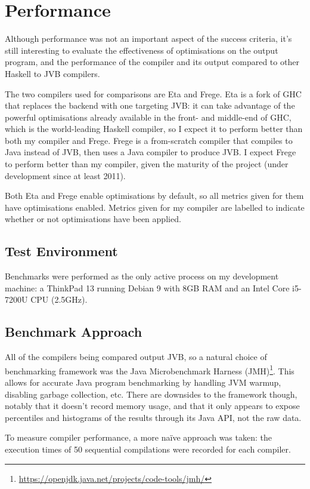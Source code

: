 \documentclass[dissertation.tex]{subfiles}
\begin{document}
\section{Performance}
{
    Although performance was not an important aspect of the success criteria, it's still interesting to evaluate the effectiveness of optimisations on the output program, and the performance of the compiler and its output compared to other Haskell to JVB compilers.

    The two compilers used for comparisons are Eta and Frege. Eta is a fork of GHC that replaces the backend with one targeting JVB: it can take advantage of the powerful optimisations already available in the front- and middle-end of GHC, which is the world-leading Haskell compiler, so I expect it to perform better than both my compiler and Frege. Frege is a from-scratch compiler that compiles to Java instead of JVB, then uses a Java compiler to produce JVB. I expect Frege to perform better than my compiler, given the maturity of the project (under development since at least 2011).

    Both Eta and Frege enable optimisations by default, so all metrics given for them have optimisations enabled. Metrics given for my compiler are labelled to indicate whether or not optimisations have been applied.

    \subsection{Test Environment}\label{sec:test-environment}
    {
        Benchmarks were performed as the only active process on my development machine: a ThinkPad 13 running Debian 9 with 8GB RAM and an Intel Core i5-7200U CPU (2.5GHz).
    }
    \subsection{Benchmark Approach}
    {
        All of the compilers being compared output JVB, so a natural choice of benchmarking framework was the Java Microbenchmark Harness (JMH)\footnote{\url{https://openjdk.java.net/projects/code-tools/jmh/}}. This allows for accurate Java program benchmarking by handling JVM warmup, disabling garbage collection, etc. There are downsides to the framework though, notably that it doesn't record memory usage, and that it only appears to expose percentiles and histograms of the results through its Java API, not the raw data.

        To measure compiler performance, a more na{\"i}ve approach was taken: the execution times of 50 sequential compilations were recorded for each compiler.
        
}}
\end{document}
